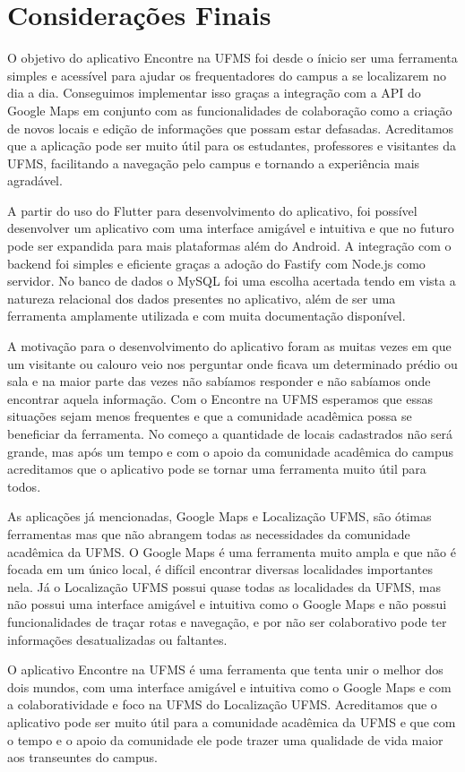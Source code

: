 \section{Considerações Finais}
\label{sec:consideracoes_finais}

    O objetivo do aplicativo Encontre na UFMS foi desde o ínicio ser uma ferramenta simples e acessível para ajudar os frequentadores do campus a se localizarem no dia a dia. Conseguimos implementar isso graças a integração com a API do Google Maps em conjunto com as funcionalidades de colaboração como a criação de novos locais e edição de informações que possam estar defasadas. Acreditamos que a aplicação pode ser muito útil para os estudantes, professores e visitantes da UFMS, facilitando a navegação pelo campus e tornando a experiência mais agradável.

    A partir do uso do Flutter para desenvolvimento do aplicativo, foi possível desenvolver um aplicativo com uma interface amigável e intuitiva e que no futuro pode ser expandida para mais plataformas além do Android. A integração com o backend foi simples e eficiente graças a adoção do Fastify com Node.js como servidor. No banco de dados o MySQL foi uma escolha acertada tendo em vista a natureza relacional dos dados presentes no aplicativo, além de ser uma ferramenta amplamente utilizada e com muita documentação disponível.

    A motivação para o desenvolvimento do aplicativo foram as muitas vezes em que um visitante ou calouro veio nos perguntar onde ficava um determinado prédio ou sala e na maior parte das vezes não sabíamos responder e não sabíamos onde encontrar aquela informação. Com o Encontre na UFMS esperamos que essas situações sejam menos frequentes e que a comunidade acadêmica possa se beneficiar da ferramenta. No começo a quantidade de locais cadastrados não será grande, mas após um tempo e com o apoio da comunidade acadêmica do campus acreditamos que o aplicativo pode se tornar uma ferramenta muito útil para todos.

    As aplicações já mencionadas, Google Maps e Localização UFMS, são ótimas ferramentas mas que não abrangem todas as necessidades da comunidade acadêmica da UFMS. O Google Maps é uma ferramenta muito ampla e que não é focada em um único local, é difícil encontrar diversas localidades importantes nela. Já o Localização UFMS possui quase todas as localidades da UFMS, mas não possui uma interface amigável e intuitiva como o Google Maps e não possui funcionalidades de traçar rotas e navegação, e por não ser colaborativo pode ter informações desatualizadas ou faltantes.

    O aplicativo Encontre na UFMS é uma ferramenta que tenta unir o melhor dos dois mundos, com uma interface amigável e intuitiva como o Google Maps e com a colaboratividade e foco na UFMS do Localização UFMS. Acreditamos que o aplicativo pode ser muito útil para a comunidade acadêmica da UFMS e que com o tempo e o apoio da comunidade ele pode trazer uma qualidade de vida maior aos transeuntes do campus.